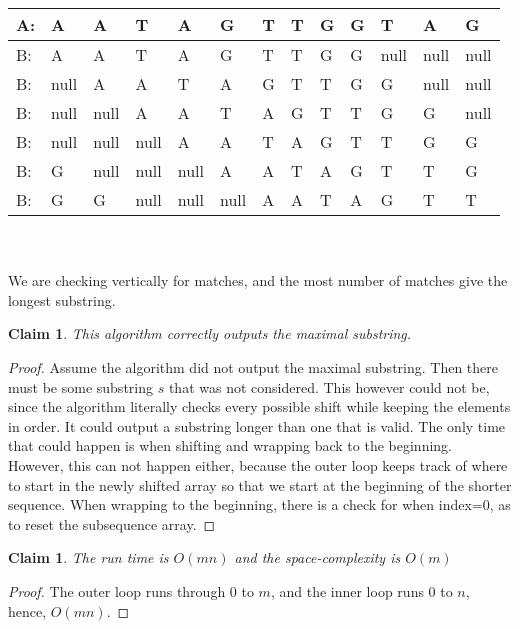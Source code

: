 \documentclass[11pt]{article}
\newtheorem{claim}[theorem]{Claim}
\begin{document}
		\begin{tabu} to 0.8\textwidth
		{ | X[l] | X[c] | X[c] | X[c] | X[c] |X[c] | X[c] | X[c] | X[c] | X[c] | X[c] |X[c] | X[c] | }
		 \hline
		 A: & A & A & T & A & G & T & T & G & G & T & A & G \\
		 \hline
		 B: & A & A & T & A & G & T & T & G & G & null & null & null \\
		 \hline
		 B: & null & A & A & T & A & G & T & T & G & G & null & null  \\
	   \hline
		 B: & null & null & A & A & T & A & G & T & T & G & G & null  \\
		 \hline
		 B: & null & null & null & A & A & T & A & G & T & T & G & G  \\
		 \hline
		 B: & G & null & null & null & A & A & T & A & G & T & T & G \\
		 \hline
		 B: & G & G & null & null & null & A & A & T & A & G & T & T\\
		 \hline
		 \end{tabu}\\
		 \\
		 We are checking vertically for matches, and the most number of matches give
		 the longest substring.

	\begin{claim}
		This algorithm correctly outputs the maximal substring.
	\end{claim}

	\begin{proof}
		Assume the algorithm did not output the maximal substring. Then there must be some substring $s$ that was not considered. This however could not be, since the algorithm literally checks every possible shift while keeping the elements in order. It could output a substring longer than one that is valid. The only time that could happen is when shifting and wrapping back to the beginning. However, this can not happen either, because the outer loop keeps track of where to start in the newly shifted array so that we start at the beginning of the shorter sequence. When wrapping to the beginning, there is a check for when index=0, as to reset the subsequence array.
	\end{proof}

	\begin{claim}
		The run time is $O(mn)$ and the space-complexity is $O(m)$
	\end{claim}

	\begin{proof}
		The outer loop runs through 0 to $m$, and the inner loop runs 0 to $n$, hence, $O(mn)$.
	\end{proof}

	\newpage
\end{document}

